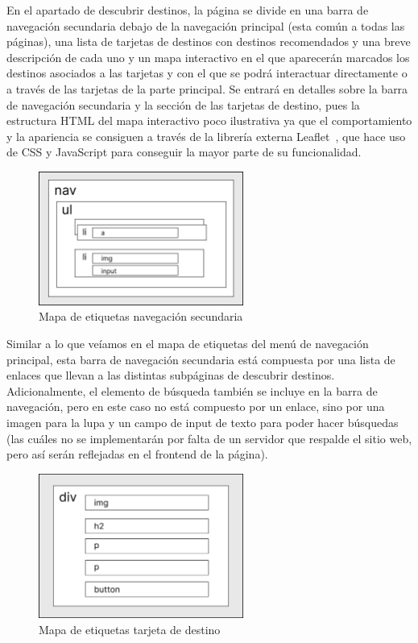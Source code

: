 \documentclass[11pt, a4paper]{book}
\begin{document}
    En el apartado de descubrir destinos, la página se divide en una barra de navegación secundaria debajo de la navegación principal (esta común a todas las páginas), una lista de tarjetas de destinos con destinos recomendados y una breve descripción de cada uno y un mapa interactivo en el que aparecerán marcados los destinos asociados a las tarjetas y con el que se podrá interactuar directamente o a través de las tarjetas de la parte principal. Se entrará en detalles sobre la barra de navegación secundaria y la sección de las tarjetas de destino, pues la estructura HTML del mapa interactivo poco ilustrativa ya que el comportamiento y la apariencia se consiguen a través de la librería externa Leaflet~\cite{leaflet}, que hace uso de CSS y JavaScript para conseguir la mayor parte de su funcionalidad.

	\newpage

	\begin{figure} [H]
		\centering
		\includegraphics[width=0.6\textwidth]{HTML/Etiq-nav-sec.jpg}
		\caption{Mapa de etiquetas navegación secundaria}
	\end{figure}

	Similar a lo que veíamos en el mapa de etiquetas del menú de navegación principal, esta barra de navegación secundaria está compuesta por una lista de enlaces que llevan a las distintas subpáginas de descubrir destinos. Adicionalmente, el elemento de búsqueda también se incluye en la barra de navegación, pero en este caso no está compuesto por un enlace, sino por una imagen para la lupa y un campo de input de texto para poder hacer búsquedas (las cuáles no se implementarán por falta de un servidor que respalde el sitio web, pero así serán reflejadas en el frontend de la página).

	\begin{figure} [H]
		\centering
		\includegraphics[width=0.6\textwidth]{HTML/Etiq-destino.jpg}
		\caption{Mapa de etiquetas tarjeta de destino}
	\end{figure}
\end{document}
